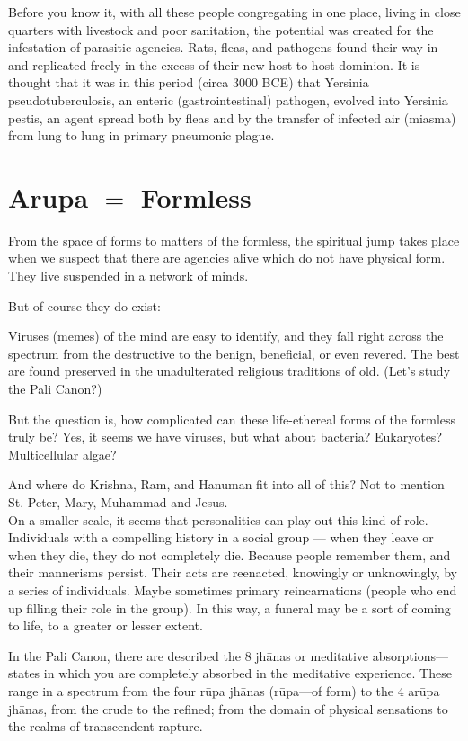 Before you know it, with all these people congregating in one place, living in close quarters with livestock and poor sanitation, the potential was created for the infestation of parasitic agencies. Rats, fleas, and pathogens found their way in and replicated freely in the excess of their new host-to-host dominion. It is thought that it was in this period (circa 3000 BCE) that Yersinia pseudotuberculosis, an enteric (gastrointestinal) pathogen, evolved into Yersinia pestis, an agent spread both by fleas and by the transfer of infected air (miasma) from lung to lung in primary pneumonic plague.

\section{Arupa $=$ Formless}

From the space of forms to matters of the formless, the spiritual jump takes place when we suspect that there are agencies alive which do not have physical form. They live suspended in a network of minds.

But of course they do exist:

Viruses (memes) of the mind are easy to identify, and they fall right across the spectrum from the destructive to the benign, beneficial, or even revered. The best are found preserved in the unadulterated religious traditions of old. (Let’s study the Pali Canon?)

But the question is, how complicated can these life-ethereal forms of the formless truly be? Yes, it seems we have viruses, but what about bacteria? Eukaryotes? Multicellular algae?

And where do Krishna, Ram, and Hanuman fit into all of this? Not to mention St. Peter,  Mary,  Muhammad and Jesus.\\

\noindent
On a smaller scale, it seems that personalities can play out this kind of role. Individuals with a compelling history in a social group — when they leave or when they die, they do not completely die. Because people remember them, and their mannerisms persist. Their acts are reenacted, knowingly or unknowingly, by a series of individuals. Maybe sometimes primary reincarnations (people who end up filling their role in the group). In this way, a funeral may be a sort of coming to life, to a greater or lesser extent.


In the Pali Canon, there are described the 8 jhānas or meditative absorptions—states in which you are completely absorbed in the meditative experience. These range in a spectrum from the four rūpa jhānas (rūpa—of form) to the 4 arūpa jhānas, from the crude to the refined; from the domain of physical sensations to the realms of transcendent rapture.

